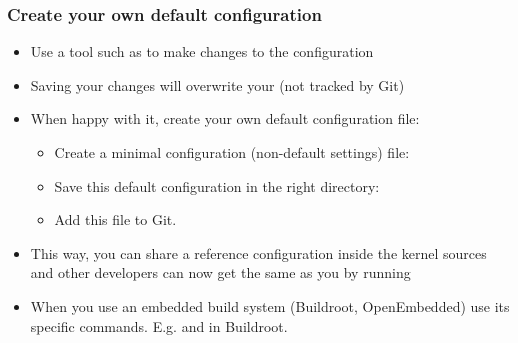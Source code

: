 \begin{frame}
  \frametitle{Create your own default configuration}
  \begin{itemize}
    \item Use a tool such as  to make changes to
      the configuration
    \item Saving your changes will overwrite your  (not
      tracked by Git)
    \item When happy with it, create your own default configuration file:
      \begin{itemize}
      \item Create a minimal configuration (non-default settings) file:\\
      \item Save this default configuration in the right directory:\\
      \item Add this file to Git.
      \end{itemize}
    \item This way, you can share a reference configuration inside
      the kernel sources and other developers can now get the same
       as you by running 
    \item When you use an embedded build system (Buildroot, OpenEmbedded)
      use its specific commands. E.g.  and
       in Buildroot.
  \end{itemize}
\end{frame}

